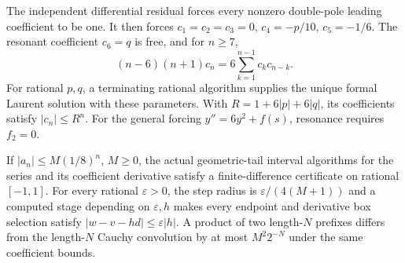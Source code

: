 \begin{theorem}
\label{thm:painleve-laurent}
The independent differential residual forces every nonzero double-pole
leading coefficient to be one. It then forces
$c_1=c_2=c_3=0$, $c_4=-p/10$, $c_5=-1/6$. The resonant coefficient
$c_6=q$ is free, and for $n\ge7$,
\[
 (n-6)(n+1)c_n=6\sum_{k=1}^{n-1}c_kc_{n-k}.
\]
For rational $p,q$, a terminating rational algorithm supplies the unique
formal Laurent solution with these parameters. With $R=1+6|p|+6|q|$,
its coefficients satisfy $|c_n|\le R^n$.
For the general forcing $y''=6y^2+f(s)$, resonance requires $f_2=0$.
\leanok
\end{theorem}

\begin{theorem}
\label{thm:geometric-box-derivative}
If $|a_n|\le M(1/8)^n$, $M\ge0$, the actual geometric-tail interval
algorithms for the series and its coefficient derivative satisfy a
finite-difference certificate on rational $[-1,1]$. For every rational
$\varepsilon>0$, the step radius is $\varepsilon/(4(M+1))$ and a computed
stage depending on $\varepsilon,h$ makes every endpoint and derivative
box selection satisfy $|w-v-hd|\le\varepsilon|h|$.
A product of two length-$N$ prefixes differs from the length-$N$
Cauchy convolution by at most $M^2 2^{-N}$ under the same coefficient bounds.
\leanok
\end{theorem}

